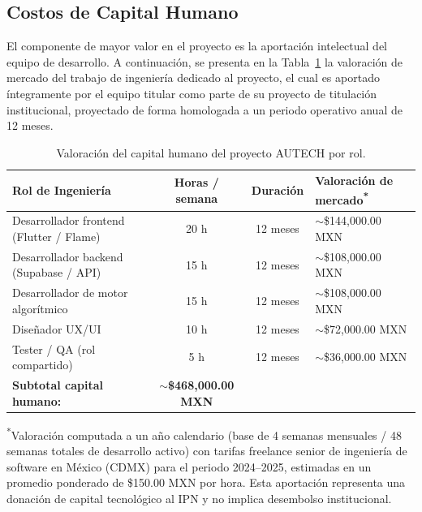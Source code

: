 \subsection{Costos de Capital Humano}
\label{subsec:costos_capital_humano}

El componente de mayor valor en el proyecto es la aportación intelectual del equipo de desarrollo. A continuación, se presenta en la Tabla~\ref{tab:capital_humano} la valoración de mercado del trabajo de ingeniería dedicado al proyecto, el cual es aportado íntegramente por el equipo titular como parte de su proyecto de titulación institucional, proyectado de forma homologada a un periodo operativo anual de 12 meses.

\begin{table}[htbp]
\centering
\caption{Valoración del capital humano del proyecto AUTECH por rol.}
\label{tab:capital_humano}
\setlength{\tabcolsep}{4pt}
\renewcommand{\arraystretch}{1.2}
\scriptsize
\begin{tabularx}{\textwidth}{@{} >{\raggedright\arraybackslash}X c c >{\raggedleft\arraybackslash}p{3.8cm} @{}}
\toprule
\textbf{Rol de Ingeniería} &
\textbf{Horas / semana} &
\textbf{Duración} &
\textbf{Valoración de mercado\textsuperscript{*}} \\
\midrule

Desarrollador frontend (Flutter / Flame)
  & 20 h & 12 meses & ${\sim}$\$144{,}000.00 MXN \\

Desarrollador backend (Supabase / API)
  & 15 h & 12 meses & ${\sim}$\$108{,}000.00 MXN \\

Desarrollador de motor algorítmico
  & 15 h & 12 meses & ${\sim}$\$108{,}000.00 MXN \\

Diseñador UX/UI
  & 10 h & 12 meses & ${\sim}$\$72{,}000.00 MXN \\

Tester / QA (rol compartido)
  &  5 h & 12 meses & ${\sim}$\$36{,}000.00 MXN \\

\midrule
\multicolumn{3}{@{} >{\raggedright\arraybackslash}p{9cm}}%
  {\textbf{Subtotal capital humano:}} &
  ${\sim}$\textbf{\$468{,}000.00 MXN} \\

\bottomrule
\end{tabularx}

\vspace{3pt}
\begin{minipage}{\textwidth}
  \scriptsize
  \textsuperscript{*}Valoración computada a un año calendario (base de 4 semanas mensuales / 48 semanas totales de desarrollo activo) con tarifas freelance senior de ingeniería de software en México (CDMX) para el periodo 2024--2025, estimadas en un promedio ponderado de \$150.00 MXN por hora. Esta aportación representa una donación de capital tecnológico al IPN y no implica desembolso institucional.
\end{minipage}
\end{table}


